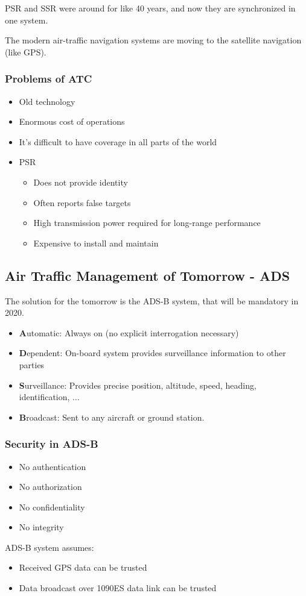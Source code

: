 PSR and SSR were around for like 40 years, and now they are synchronized in one 
system.

The modern air-traffic navigation systems are moving to the satellite 
navigation (like GPS).

\subsubsection{Problems of ATC}
\begin{itemize}
	\item Old technology
	\item Enormous cost of operations
	\item It's difficult to have coverage in all parts of the world
	\item PSR
	\begin{itemize}
		\item Does not provide identity
		\item Often reports false targets
		\item High transmission power required for long-range performance
		\item Expensive to install and maintain
	\end{itemize}
\end{itemize}

\subsection{Air Traffic Management of Tomorrow - ADS} The solution for the 
tomorrow is the ADS-B system, that will be mandatory in 2020.
\begin{itemize}
	\item \textbf{A}utomatic: Always on (no explicit interrogation necessary)
	\item \textbf{D}ependent: On-board system provides surveillance information 
	to other parties
	\item \textbf{S}urveillance: Provides precise position, altitude, speed, 
	heading, identification, ...
	\item \textbf{B}roadcast: Sent to any aircraft or ground station.
\end{itemize}

\subsubsection{Security in ADS-B}
\begin{itemize}
	\item No authentication
	\item No authorization
	\item No confidentiality
	\item No integrity
\end{itemize}
ADS-B system assumes:
\begin{itemize}
	\item Received GPS data can be trusted
	\item Data broadcast over 1090ES data link can be trusted
\end{itemize}
